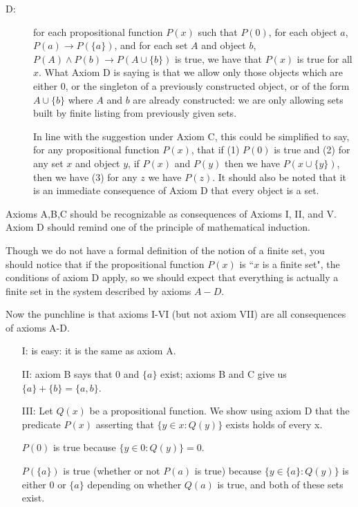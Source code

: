 \documentclass[12pt]{article}
\begin{document}
\begin{enumerate}
\begin{description}
\begin{description}
\item[D:]  for each propositional function $P(x)$ such that $P(0)$, for each object $a$, $P(a) \rightarrow P(\{a\})$, and for each set $A$ and object $b$,
$P(A) \wedge P(b) \rightarrow P(A \cup \{b\})$ is true, we have that $P(x)$ is true for all $x$.  What Axiom D is saying is that we allow only those objects which
are either 0, or the singleton of a previously constructed object, or of the form $A \cup \{b\}$ where $A$ and $b$ are already constructed:  we are only allowing sets built by finite listing from previously given sets.

In line with the suggestion under Axiom C, this could be simplified to say, for any propositional function $P(x)$, that if (1) $P(0)$ is true and (2) for any set $x$ and object $y$,
if $P(x)$ and $P(y)$ then we have $P(x \cup \{y\})$, then we have (3) for any $z$ we have $P(z)$.  It should also be noted that it is an immediate consequence of Axiom D that every object is a set.

\end{description}

Axioms A,B,C should be recognizable as consequences of Axioms I, II, and V.  Axiom D should remind one of the principle of mathematical induction.

Though we do not have a formal definition of the notion of a finite set, you should notice that if the propositional function $P(x)$ is ``$x$ is a finite set",
the conditions of axiom D apply, so we should expect that everything is actually a finite set in the system described by axioms $A-D$.

Now the punchline is that axioms I-VI (but not axiom VII) are all consequences of axioms A-D.

\begin{enumerate}

\item[I:] is easy:  it is the same as axiom A.

\item[II:]  axiom B says that 0 and $\{a\}$ exist;  axioms B and C give us $\{a\}+\{b\} = \{a,b\}$.

\item[III:] Let $Q(x)$ be a propositional function.  We show using axiom D that the predicate $P(x)$ asserting that $\{y \in x:Q(y)\}$ exists holds of every x.

$P(0)$ is true because $\{y \in 0:Q(y)\} = 0$.

$P(\{a\})$ is true (whether or not $P(a)$ is true) because $\{y \in \{a\}:Q(y)\}$ is either 0 or $\{a\}$ depending on whether $Q(a)$ is true,
and both of these sets exist.


\end{enumerate}
\end{description}
\end{enumerate}
\end{document}
